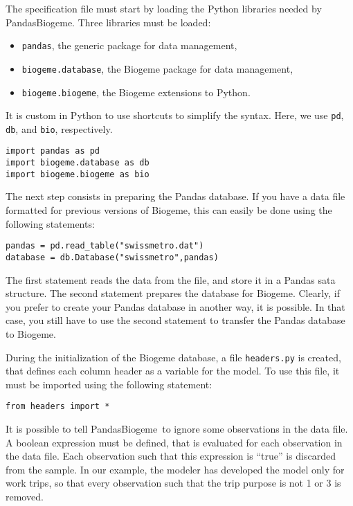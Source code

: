 \documentclass[12pt,a4paper]{article}
\newcommand{\PDBIOGEME}{PandasBiogeme}
\begin{document}
The specification file must start by loading the Python libraries
needed by \PDBIOGEME. Three libraries must be loaded:
\begin{itemize}
\item \lstinline+pandas+, the generic package for data management,
\item \lstinline+biogeme.database+, the Biogeme package for data management,
\item \lstinline+biogeme.biogeme+, the Biogeme extensions to Python. 
\end{itemize}
It is custom in Python to use shortcuts to simplify the syntax. Here,
we use \lstinline+pd+,  \lstinline+db+, and  \lstinline+bio+,
respectively.   

\begin{lstlisting}[style=nonumbers]
import pandas as pd
import biogeme.database as db
import biogeme.biogeme as bio
\end{lstlisting}

The next step consists in preparing the Pandas database. If you have
a data file formatted for previous versions of Biogeme,   this can easily be done using the
following statements:
\begin{lstlisting}[style=nonumbers]
pandas = pd.read_table("swissmetro.dat")
database = db.Database("swissmetro",pandas)
\end{lstlisting}
The first statement reads the data from the file, and store it in a
Pandas sata structure. The second statement prepares the database for
Biogeme. 
Clearly, if you prefer to create your Pandas database in another way,
it is possible. In that case, you still have to use the second statement to
transfer the Pandas database to Biogeme. 

During the initialization of the Biogeme database, a
file \lstinline+headers.py+ is created, that defines each column
header as a variable for the model. To use this file, it must be
imported using the following statement: 
\begin{lstlisting}[style=nonumbers]
from headers import *
\end{lstlisting}

It is possible to tell \PDBIOGEME\ to ignore some
observations in the data file. A boolean expression must be defined, that
is evaluated for each observation in the data file.  Each observation
such that this expression is ``true'' is discarded from the
sample. In our example, the modeler has developed the model only for
work trips, so that every observation such that the trip purpose is not 1
or 3 is removed.
\end{document}
